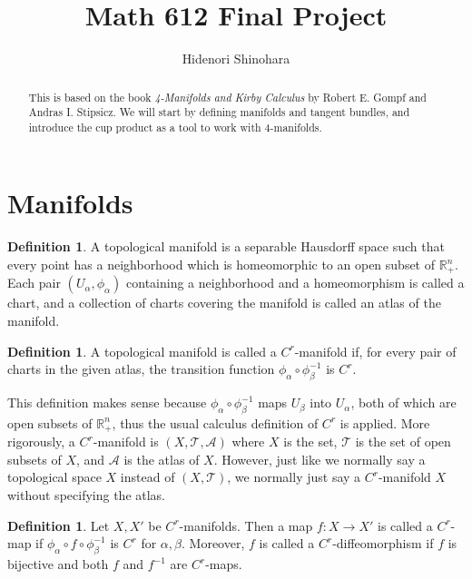 \documentclass[11pt, psamsfonts]{amsart}
\theoremstyle{definition}
\newtheorem{defn}[thm]{Definition}
\theoremstyle{remark}
\numberwithin{equation}{section}
\begin{document}
\title{Math 612 Final Project}
\author{Hidenori Shinohara}
\maketitle

\begin{abstract}
  This is based on the book \textit{4-Manifolds and Kirby Calculus} by Robert E. Gompf and Andras I. Stipsicz.
  We will start by defining manifolds and tangent bundles, and introduce the cup product as a tool to work with 4-manifolds.
\end{abstract}
\tableofcontents

\section{Manifolds}

\begin{defn}
  A topological manifold is a separable Hausdorff space such that every point has a neighborhood which is homeomorphic to an open subset of $\mathbb{R}^n_{+}$.
  Each pair $(U_{\alpha}, \phi_{\alpha})$ containing a neighborhood and a homeomorphism is called a chart, and a collection of charts covering the manifold is called an atlas of the manifold.
\end{defn}

\begin{defn}
  A topological manifold is called a $C^r$-manifold if, for every pair of charts in the given atlas, the transition function $\phi_{\alpha} \circ \phi_{\beta}^{-1}$ is $C^r$.
\end{defn}

This definition makes sense because $\phi_{\alpha} \circ \phi_{\beta}^{-1}$ maps $U_{\beta}$ into $U_{\alpha}$, both of which are open subsets of $\mathbb{R}^n_{+}$, thus the usual calculus definition of $C^r$ is applied.
More rigorously, a $C^r$-manifold is $(X, \mathcal{T}, \mathcal{A})$ where $X$ is the set, $\mathcal{T}$ is the set of open subsets of $X$, and $\mathcal{A}$ is the atlas of $X$.
However, just like we normally say a topological space $X$ instead of $(X, \mathcal{T})$, we normally just say a $C^r$-manifold $X$ without specifying the atlas.

\begin{defn}
  Let $X, X'$ be $C^r$-manifolds.
  Then a map $f: X \rightarrow X'$ is called a $C^r$-map if $\phi_{\alpha} \circ f \circ \phi_{\beta}^{-1}$ is $C^r$ for $\alpha, \beta$.
  Moreover, $f$ is called a $C^r$-diffeomorphism if $f$ is bijective and both $f$ and $f^{-1}$ are $C^r$-maps.
\end{defn}
\end{document}
